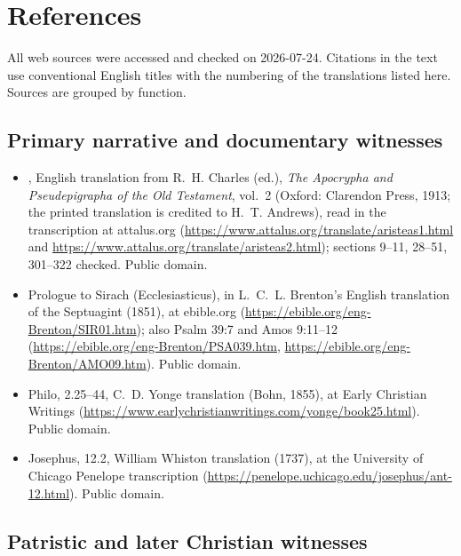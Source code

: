 \section{References}

All web sources were accessed and checked on 2026-07-24. Citations in the
text use conventional English titles with the numbering of the
translations listed here. Sources are grouped by function.

\subsection*{Primary narrative and documentary witnesses}

\begin{itemize}
\item {}, English translation from R.~H. Charles
(ed.), \textit{The Apocrypha and Pseudepigrapha of the Old Testament},
vol.~2 (Oxford: Clarendon Press, 1913; the printed translation is credited
to H.~T. Andrews), read in the transcription at attalus.org
(\url{https://www.attalus.org/translate/aristeas1.html} and
\url{https://www.attalus.org/translate/aristeas2.html}); sections 9--11,
28--51, 301--322 checked. Public domain.
\item Prologue to Sirach (Ecclesiasticus), in L.~C.~L. Brenton's English
translation of the Septuagint (1851), at ebible.org
(\url{https://ebible.org/eng-Brenton/SIR01.htm}); also Psalm 39:7 and Amos
9:11--12 (\url{https://ebible.org/eng-Brenton/PSA039.htm},
\url{https://ebible.org/eng-Brenton/AMO09.htm}). Public domain.
\item Philo,  2.25--44, C.~D. Yonge
translation (Bohn, 1855), at Early Christian Writings
(\url{https://www.earlychristianwritings.com/yonge/book25.html}). Public
domain.
\item Josephus,  12.2, William Whiston
translation (1737), at the University of Chicago Penelope transcription
(\url{https://penelope.uchicago.edu/josephus/ant-12.html}). Public
domain.
\end{itemize}

\subsection*{Patristic and later Christian witnesses}

